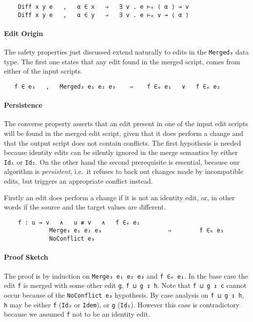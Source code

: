 \documentclass[preprint]{sigplanconf}
\begin{document}
\begin{verbatim}
    Diff x y e   ,   α ∈ x   ⇒   ∃ v . e ⊢ₑ ⟨ α ⟩ ⇝ v
    Diff x y e   ,   α ∈ y   ⇒   ∃ v . e ⊢ₑ v ⇝ ⟨ α ⟩
\end{verbatim}
 
    \paragraph{Edit Origin}
    The safety properties just discussed extend naturally to edits in the 
    \texttt{Merged₃} data type.
    The first one states that any edit found in the merged script,
    comes from either of the input scripts.
\begin{verbatim}
   f ∈ e₃   ,   Merged₃ e₁ e₂ e₃    ⇒    f ∈ₑ e₁   ∨   f ∈ₑ e₂
\end{verbatim}
    
    \paragraph{Persistence}
    The converse property asserts that an edit present in one of the input
    edit scripts will be found in the merged edit script, given that it does
    perform a change and that the output script does not contain conflicts.
    The first hypothesis is needed because identity edits can be silently 
    ignored in the merge semantics by either \texttt{Id₁} or
    \texttt{Id₂}.
    On the other hand the second prerequisite is essential, because 
    our algorithm is \emph{persistent}, i.e.\ it refuses to back out changes 
    made by incompatible edits, but triggers an appropriate conflict instead.

    Firstly an edit does perform a change if it is not an identity edit, or, in 
    other words if the source and the target values are different.
				
\begin{verbatim}
    f : u ⇝ v   ∧   u ≢ v   ∧   f ∈ₑ e₁
             Merge₃ e₁ e₂ e₃                   ⇒        f ∈ₑ e₃
             NoConflict e₃ 
\end{verbatim}
    \paragraph{Proof Sketch}
    The proof is by induction on \texttt{Merge₃ e₁ e₂ e₃} and \texttt{f ∈ₑ e₁}.
    In the base case the edit \texttt{f} is merged with some other edit \texttt{g},
    \texttt{f ⊔ g ↧ h}. Note that \texttt{f ⊔ g ↥ c} cannot occur because of
    the \texttt{NoConflict e₃} hypothesis. By case analysis on \texttt{f ⊔ g ↧ h},
    \texttt{h} may be either \texttt{f} (\texttt{Id₂} or \texttt{Idem}), or 
    \texttt{g} (\texttt{Id₁}). However this case is contradictory because we
    assumed \texttt{f} not to be an identity edit.
    
\end{document}
